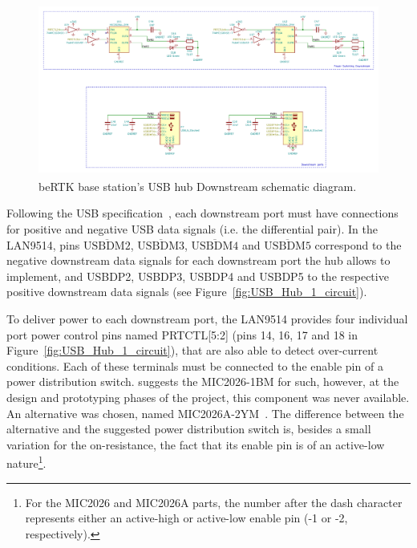 \begin{figure}[h]
	\centering
	\includegraphics[width=1.0\textwidth]{Chapters/Figures/chapter3/USB_Hub_Downstream.pdf}
	\caption{beRTK\textsuperscript{\textregistered} base station's USB hub Downstream schematic diagram.}
	\label{fig:USB_Hub_Downstream_circuit}
\end{figure}

Following the USB specification~\cite{USB_Specification}, each downstream port must have connections for positive and negative USB data signals (i.e. the differential pair). In the LAN9514, pins $\overline{\mbox{USBDM2}}$, $\overline{\mbox{USBDM3}}$, $\overline{\mbox{USBDM4}}$ and $\overline{\mbox{USBDM5}}$ correspond to the negative downstream data signals for each downstream port the hub allows to implement, and USBDP2, USBDP3, USBDP4 and USBDP5 to the respective positive downstream data signals (see Figure~\ref{fig:USB_Hub_1_circuit}).

To deliver power to each downstream port, the LAN9514 provides four individual port power control pins named PRTCTL[5:2] (pins 14, 16, 17 and 18 in Figure~\ref{fig:USB_Hub_1_circuit}), that are also able to detect over-current conditions. Each of these terminals must be connected to the enable pin of a power distribution switch.
\cite{LAN9514_ref_schematic} suggests the MIC2026-1BM for such, however, at the design and prototyping phases of the project, this component was never available. An alternative was chosen, named MIC2026A-2YM~\cite{MIC2026A}. The difference between the alternative and the suggested power distribution switch is, besides a small variation for the on-resistance, the fact that its enable pin is of an active-low nature\footnote[18]{For the MIC2026 and MIC2026A parts, the number after the dash character represents either an active-high or active-low enable pin (-1 or -2, respectively).}.

